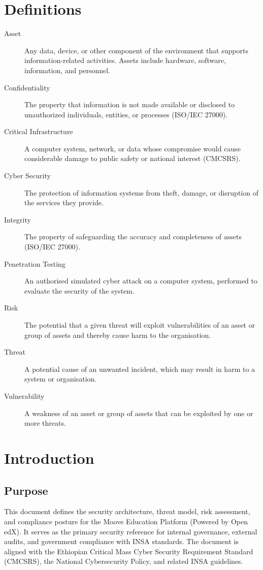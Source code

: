 \section*{Definitions}

\begin{description}
    \item[Asset] Any data, device, or other component of the environment that supports information-related activities. Assets include hardware, software, information, and personnel.
    \item[Confidentiality] The property that information is not made available or disclosed to unauthorized individuals, entities, or processes (ISO/IEC 27000).
    \item[Critical Infrastructure] A computer system, network, or data whose compromise would cause considerable damage to public safety or national interest (CMCSRS).
    \item[Cyber Security] The protection of information systems from theft, damage, or disruption of the services they provide.
    \item[Integrity] The property of safeguarding the accuracy and completeness of assets (ISO/IEC 27000).
    \item[Penetration Testing] An authorised simulated cyber attack on a computer system, performed to evaluate the security of the system.
    \item[Risk] The potential that a given threat will exploit vulnerabilities of an asset or group of assets and thereby cause harm to the organisation.
    \item[Threat] A potential cause of an unwanted incident, which may result in harm to a system or organisation.
    \item[Vulnerability] A weakness of an asset or group of assets that can be exploited by one or more threats.
\end{description}

\section{Introduction}

\subsection{Purpose}
This document defines the security architecture, threat model, risk assessment, and compliance posture for the Moove Education Platform (Powered by Open edX). It serves as the primary security reference for internal governance, external audits, and government compliance with INSA standards. The document is aligned with the Ethiopian Critical Mass Cyber Security Requirement Standard (CMCSRS), the National Cybersecurity Policy, and related INSA guidelines.

